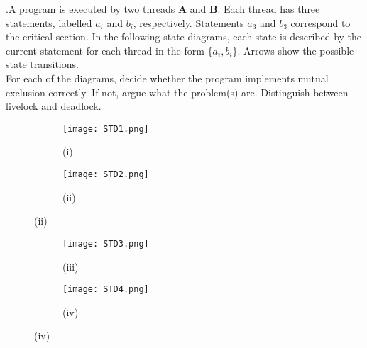 \documentclass[main]{subfiles}
\begin{document}
    \begin{ExerciseList}
        
        \Exercise[title={Mutual Exclusion},label=MEI].\quad A program is executed by two threads \textbf{A} and \textbf{B}. Each thread has three statements, labelled $a_i$ and $b_i$, respectively. Statements $a_3$ and $b_3$ correspond to the critical section. In the following state diagrams, each state is described by the current statement for each thread in the form $\{a_i,b_i\}$. Arrows show the possible state transitions.\\[3mm] 
        For each of the diagrams, decide whether the program implements mutual exclusion correctly. If not, argue what the problem(s) are. Distinguish between livelock and deadlock.
                
            \begin{figure}[H]
                \centering
                \begin{subfigure}{.5\textwidth}
                    \centering
                    \texttt{[image: STD1.png]}
                    \captionsetup{labelformat=empty}
                    \caption{(i)}
                \end{subfigure}%
                \begin{subfigure}{.5\textwidth}
                    \centering
                    \texttt{[image: STD2.png]}
                    \captionsetup{labelformat=empty}
                    \caption{(ii)}
                \end{subfigure}
            \end{figure}
            
            \begin{figure}[H]
                \centering
                \begin{subfigure}{.5\textwidth}
                    \centering
                    \texttt{[image: STD3.png]}
                    \captionsetup{labelformat=empty}
                    \caption{(iii)}
                \end{subfigure}%
                \begin{subfigure}{.5\textwidth}
                    \centering
                    \texttt{[image: STD4.png]}
                    \captionsetup{labelformat=empty}
                    \caption{(iv)}
                \end{subfigure}
            \end{figure}
            

\end{ExerciseList}
\end{document}
